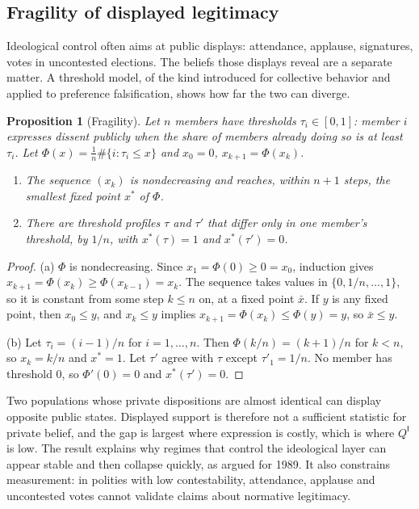 \documentclass[11pt,letterpaper]{article}
\newtheorem{proposition}[theorem]{Proposition}
\theoremstyle{definition}
\theoremstyle{remark}
\newcommand{\pI}{\mathsf{I}}
\begin{document}
\subsection{Fragility of displayed legitimacy}

Ideological control often aims at public displays: attendance, applause, signatures, votes in uncontested elections. The beliefs those displays reveal are a separate matter. A threshold model, of the kind \citet{granovetter1978} introduced for collective behavior and \citet{kuran1991} applied to preference falsification, shows how far the two can diverge.

\begin{proposition}[Fragility]
\label{prop:ideological-power:fragility}
Let $n$ members have thresholds $\tau_i\in[0,1]$: member $i$ expresses dissent publicly when the share of members already doing so is at least $\tau_i$. Let $\Phi(x)=\frac1n\#\{i:\tau_i\leq x\}$ and $x_0=0$, $x_{k+1}=\Phi(x_k)$.
\begin{enumerate}
\item[(a)] The sequence $(x_k)$ is nondecreasing and reaches, within $n+1$ steps, the smallest fixed point $x^\ast$ of $\Phi$.
\item[(b)] There are threshold profiles $\tau$ and $\tau'$ that differ only in one member's threshold, by $1/n$, with $x^\ast(\tau)=1$ and $x^\ast(\tau')=0$.
\end{enumerate}
\end{proposition}

\begin{proof}
(a) $\Phi$ is nondecreasing. Since $x_1=\Phi(0)\geq0=x_0$, induction gives $x_{k+1}=\Phi(x_k)\geq\Phi(x_{k-1})=x_k$. The sequence takes values in $\{0,1/n,\dots,1\}$, so it is constant from some step $k\leq n$ on, at a fixed point $\bar x$. If $y$ is any fixed point, then $x_0\leq y$, and $x_k\leq y$ implies $x_{k+1}=\Phi(x_k)\leq\Phi(y)=y$, so $\bar x\leq y$.

(b) Let $\tau_i=(i-1)/n$ for $i=1,\dots,n$. Then $\Phi(k/n)=(k+1)/n$ for $k<n$, so $x_k=k/n$ and $x^\ast=1$. Let $\tau'$ agree with $\tau$ except $\tau'_1=1/n$. No member has threshold $0$, so $\Phi'(0)=0$ and $x^\ast(\tau')=0$.
\end{proof}

Two populations whose private dispositions are almost identical can display opposite public states. Displayed support is therefore not a sufficient statistic for private belief, and the gap is largest where expression is costly, which is where $Q^{\pI}$ is low. The result explains why regimes that control the ideological layer can appear stable and then collapse quickly, as \citet{kuran1991} argued for 1989. It also constrains measurement: in polities with low contestability, attendance, applause and uncontested votes cannot validate claims about normative legitimacy.
\end{document}
